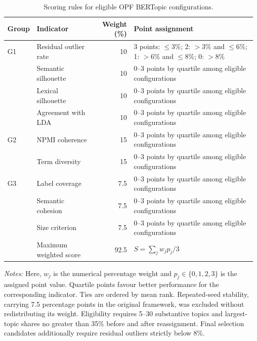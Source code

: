\documentclass[a4paper,fleqn]{cas-sc}
\begin{document}
\begin{table}[htbp]
\centering
\caption{Scoring rules for eligible OPF BERTopic configurations.}
\label{tab:opf_scoring_rules}
\scriptsize
\setlength{\tabcolsep}{4pt}
\renewcommand{\arraystretch}{1.15}
\begin{tabularx}{\textwidth}{p{15mm}p{40mm}r X}
\toprule
Group & Indicator & Weight (\%) & Point assignment \\
\midrule
G1 & Residual outlier rate & 10 & 3 points: $\leq3\%$; 2: $>3\%$ and $\leq6\%$; 1: $>6\%$ and $\leq8\%$; 0: $>8\%$ \\
& Semantic silhouette & 10 & 0--3 points by quartile among eligible configurations \\
& Lexical silhouette & 10 & 0--3 points by quartile among eligible configurations \\
& Agreement with LDA & 10 & 0--3 points by quartile among eligible configurations \\
\midrule
G2 & NPMI coherence & 15 & 0--3 points by quartile among eligible configurations \\
& Term diversity & 15 & 0--3 points by quartile among eligible configurations \\
\midrule
G3 & Label coverage & 7.5 & 0--3 points by quartile among eligible configurations \\
& Semantic cohesion & 7.5 & 0--3 points by quartile among eligible configurations \\
& Size criterion & 7.5 & 0--3 points by quartile among eligible configurations \\
\midrule
& Maximum weighted score & 92.5 & $S=\sum_j w_jp_j/3$ \\
\bottomrule
\end{tabularx}
\vspace{2mm}
\begin{minipage}{\textwidth}
\footnotesize
\textit{Notes:} Here, $w_j$ is the numerical percentage weight and $p_j\in\{0,1,2,3\}$ is the assigned point value. Quartile points favour better performance for the corresponding indicator. Ties are ordered by mean rank. Repeated-seed stability, carrying 7.5 percentage points in the original framework, was excluded without redistributing its weight. Eligibility requires 5--30 substantive topics and largest-topic shares no greater than 35\% before and after reassignment. Final selection candidates additionally require residual outliers strictly below 8\%.
\end{minipage}
\end{table}
\end{document}
